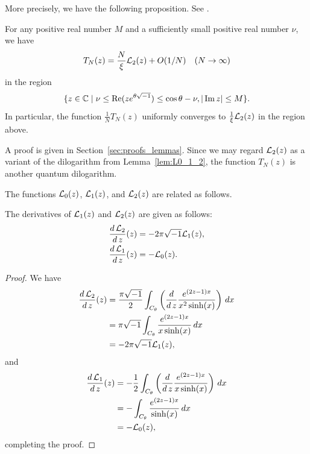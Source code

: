 More precisely, we have the following proposition.
See \cite[Proposition~A.1]{Ohtsuki:QT2016}.
\begin{prop}\label{prop:T_N_L_2}
For any positive real number $M$ and a sufficiently small positive real number $\nu$, we have
\begin{equation*}
  T_N(z)
  =
  \frac{N}{\xi}\mathcal{L}_2(z)
  +
  O(1/N)
  \quad(N\to\infty)
\end{equation*}
in the region
\begin{equation*}
  \{z\in\mathbb{C}\mid\nu\le\operatorname{Re}(ze^{\theta\sqrt{-1}})\le\cos\theta-\nu,|\operatorname{Im}{z}|\le M\}.
\end{equation*}
In particular, the function $\frac{1}{N}T_N(z)$ uniformly converges to $\frac{1}{\xi}\mathcal{L}_2(z)$ in the region above.
\end{prop}
A proof is given in Section~\ref{sec:proofs_lemmas}.
Since we may regard $\mathcal{L}_2(z)$ as a variant of the dilogarithm from Lemma~\ref{lem:L0_1_2}, the function $T_{N}(z)$ is another quantum dilogarithm.
\par
The functions $\mathcal{L}_{0}(z)$, $\mathcal{L}_{1}(z)$, and $\mathcal{L}_{2}(z)$ are related as follows.
\begin{lem}\label{lem:der_L}
The derivatives of $\mathcal{L}_1(z)$ and $\mathcal{L}_2(z)$ are given as follows:
\begin{align*}
  \frac{d\,\mathcal{L}_2}{d\,z}(z)
  &=
  -2\pi\sqrt{-1}\mathcal{L}_1(z),
  \\
  \dfrac{d\,\mathcal{L}_1}{d\,z}(z)
  &=
  -\mathcal{L}_0(z).
\end{align*}
\end{lem}
\begin{proof}
We have
\begin{equation*}
\begin{split}
  \frac{d\,\mathcal{L}_2}{d\,z}(z)
  &=
  \frac{\pi\sqrt{-1}}{2}\int_{C_{\theta}}\left(\frac{d}{d\,z}\frac{e^{(2z-1)x}}{x^2\sinh(x)}\right)\,dx
  \\
  &=
  \pi\sqrt{-1}\int_{C_{\theta}}\frac{e^{(2z-1)x}}{x\sinh(x)}\,dx
  \\
  &=
  -2\pi\sqrt{-1}\mathcal{L}_1(z),
\end{split}
\end{equation*}
and
\begin{equation*}
\begin{split}
  \frac{d\,\mathcal{L}_1}{d\,z}(z)
  &=
  -\frac{1}{2}\int_{C_{\theta}}\left(\frac{d}{d\,z}\frac{e^{(2z-1)x}}{x\sinh(x)}\right)\,dx
  \\
  &=
  -\int_{C_{\theta}}\frac{e^{(2z-1)x}}{\sinh(x)}\,dx
  \\
  &=
  -\mathcal{L}_0(z),
\end{split}
\end{equation*}
completing the proof.
\end{proof}